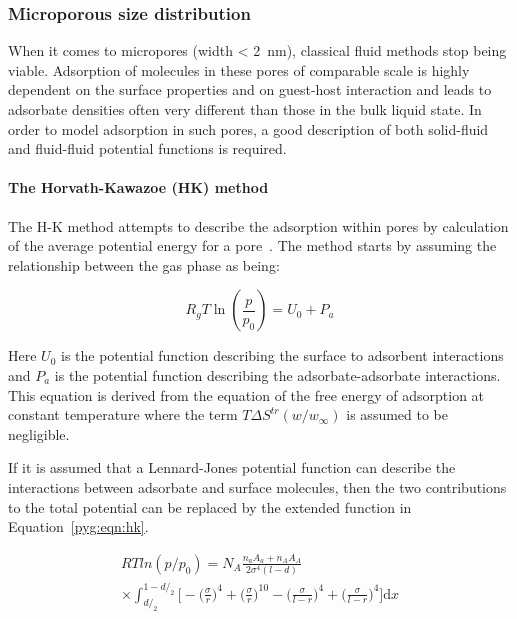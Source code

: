 \subsubsection{Microporous size distribution}

When it comes to micropores (width \SI{< 2}{\nano\metre}), classical
fluid methods stop being viable. Adsorption of molecules in these pores
of comparable scale is highly dependent on the surface properties and
on guest-host interaction and leads to adsorbate densities often
very different than those in the bulk liquid state.
In order to model adsorption in such pores, a good description of
both solid-fluid and fluid-fluid potential functions is required.

\paragraph{The Horvath-Kawazoe (HK) method}

The H-K method attempts to describe the adsorption within pores
by calculation of the average potential energy for a
pore~\cite{horvathMethodCalculationEffective1983}.
The method starts by assuming the
relationship between the gas phase as being:

\begin{equation}
	R_g T \ln(\frac{p}{p_0}) = U_0 + P_a
\end{equation}

Here \(U_0\) is the potential function describing the surface to adsorbent
interactions and \(P_a\) is the potential function describing the
adsorbate-adsorbate interactions. This equation is derived from the
equation of the free energy of adsorption at constant temperature where
the term \(T \Delta S^{tr}(w/w_{\infty})\) is assumed to be negligible.

If it is assumed that a Lennard-Jones potential function can describe
the interactions between adsorbate and surface molecules, then
the two contributions to the total potential can be replaced by the
extended function in Equation~\ref{pyg:eqn:hk}.

\begin{multline}\label{pyg:eqn:hk}
	RTln(p/p_0) =   N_A\frac{n_a A_a + n_A A_A}{2 \sigma^{4}(l-d)} \\
	\times \int_{d/_2}^{1-d/_2}
	\Big[
		- \Big(\frac{\sigma}{r}\Big)^{4}
		+ \Big(\frac{\sigma}{r}\Big)^{10}
		- \Big(\frac{\sigma}{l-r}\Big)^{4}
		+ \Big(\frac{\sigma}{l-r}\Big)^{4}
		\Big] \mathrm{d}x
\end{multline}

